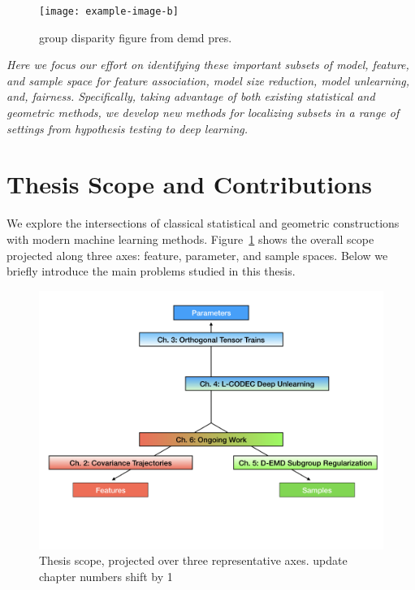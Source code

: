 \begin{figure}
    \centering
    \texttt{[image: example-image-b]}
    \caption[Equating sample subsets]{\color{red} group disparity figure from demd pres.}
\end{figure}

\begin{mdframed}[style=MyFrame]
\em 
Here we focus our effort on identifying these important subsets of model, feature, and sample space for feature association, model size reduction, model unlearning, and, fairness. Specifically, taking advantage of both existing statistical and geometric methods, we develop new methods for localizing subsets in a range of settings from hypothesis testing to deep learning.
\end{mdframed}

\section{Thesis Scope and Contributions}

We explore the intersections of classical statistical and geometric constructions with modern machine learning methods. 
Figure~\ref{fig:scope} shows the overall scope projected along three axes: feature, parameter, and sample spaces.
Below we briefly introduce the main problems studied in this thesis.
\begin{figure}[!ht]
    \centering
    \includegraphics[width=0.95\linewidth]{diss/1_intro/figs/thesis_scope.png}
    \caption[Thesis Scope]{Thesis scope, projected over three representative axes. {\color{red} update chapter numbers shift by 1}}
    \label{fig:scope}
\end{figure}

